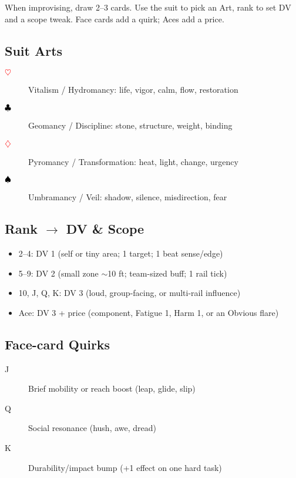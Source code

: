 When improvising, draw 2--3 cards. Use the suit to pick an Art, rank to set DV and a scope tweak. Face cards add a quirk; Aces add a price.

\subsection{Suit Arts}
\begin{description}
\item[\textcolor{red}{$\heartsuit$}] Vitalism / Hydromancy: life, vigor, calm, flow, restoration
\item[\textcolor{black}{$\clubsuit$}] Geomancy / Discipline: stone, structure, weight, binding
\item[\textcolor{red}{$\diamondsuit$}] Pyromancy / Transformation: heat, light, change, urgency
\item[\textcolor{black}{$\spadesuit$}] Umbramancy / Veil: shadow, silence, misdirection, fear
\end{description}

\subsection{Rank $\rightarrow$ DV \& Scope}
\begin{itemize}
\item 2--4: DV 1 (self or tiny area; 1 target; 1 beat sense/edge)
\item 5--9: DV 2 (small zone $\sim$10 ft; team-sized buff; 1 rail tick)
\item 10, J, Q, K: DV 3 (loud, group-facing, or multi-rail influence)
\item Ace: DV 3 + price (component, Fatigue 1, Harm 1, or an Obvious flare)
\end{itemize}

\subsection{Face-card Quirks}
\begin{description}
\item[J] Brief mobility or reach boost (leap, glide, slip)
\item[Q] Social resonance (hush, awe, dread)
\item[K] Durability/impact bump (+1 effect on one hard task)
\end{description}

